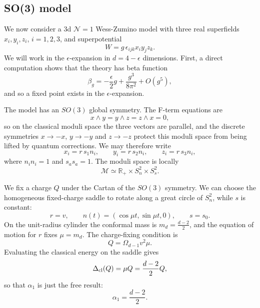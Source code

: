 \documentclass[a4paper,11pt]{article}
\begin{document}
\subsection{SO(3) model}


We now consider a 3d $\mathcal N=1$ Wess-Zumino model with three real superfields $x_i,y_i,z_i$, $i=1,2,3$, and superpotential
\begin{equation}
  W = g\,\epsilon_{ijk}x_i y_j z_k .
\end{equation}
We will work in the $\epsilon$-expansion in $d=4-\epsilon$ dimensions. First, a direct computation shows that the theory has beta function
\begin{equation}
  \beta_g = -\frac{\epsilon}{2}g + \frac{g^3}{8\pi^2} +O(g^5),
\end{equation}
and so a fixed point exists in the $\epsilon$-expansion.

The model has an $SO(3)$ global symmetry. The F-term equations are
\begin{equation}
  x \wedge y = y \wedge z = z \wedge x =0 ,
\end{equation}
so on the classical moduli space the three vectors are parallel, and the discrete symmetries $x\to -x$, $y\to -y$ and $z\to -z$ protect this moduli space from being lifted by quantum corrections. We may therefore write
\begin{equation}
  x_i = r\,s_1 n_i,\qquad y_i = r\,s_2 n_i,\qquad z_i = r\,s_3 n_i ,
\end{equation}
where $n_i n_i=1$ and $s_a s_a=1$. The moduli space is locally
\begin{equation}
  \mathcal M \simeq \mathbb R_+ \times S^2_n \times S^2_s .
\end{equation}

We fix a charge $Q$ under the Cartan of the $SO(3)$ symmetry. We can choose the homogeneous fixed-charge saddle to rotate along a great circle of $S^2_n$, while $s$ is constant:
\begin{equation}
  r=v,\qquad n(t)=(\cos \mu t,\sin \mu t,0),\qquad s=s_0 .
\end{equation}
On the unit-radius cylinder the conformal mass is $ m_d=\frac{d-2}{2}$, and the equation of motion for $r$ fixes $ \mu=m_d$. The charge-fixing condition is
\begin{equation}
  Q=\Omega_{d-1} v^2 \mu .
\end{equation}
Evaluating the classical energy on the saddle gives
\begin{equation}
  \Delta_{\rm cl}(Q)=\mu Q = \frac{d-2}{2}Q,
\end{equation}
so that $\alpha_1$ is just the free result: 
\begin{equation}
  \alpha_1 = \frac{d-2}{2}.
\end{equation}
\end{document}
